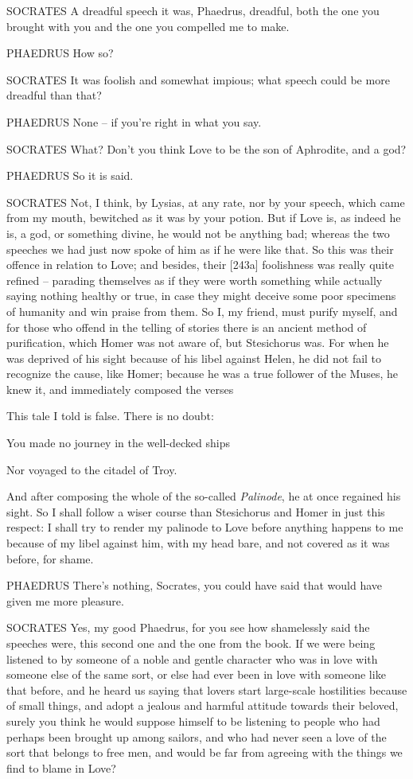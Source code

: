 SOCRATES A dreadful speech it was, Phaedrus, dreadful, both the one you
brought with you and the one you compelled me  to make.

PHAEDRUS How so?

SOCRATES It was foolish and somewhat impious; what speech could be more
dreadful than that?

PHAEDRUS None -- if you're right in what you say.

SOCRATES What? Don't you think Love to be the son of Aphrodite, and a
god?

 PHAEDRUS So it is said.

SOCRATES Not, I think, by Lysias, at any rate, nor by your 
speech, which came from my mouth, bewitched as it was by your
potion. But if Love is,
as indeed he is, a god, or something divine, he would not be anything
bad; whereas the two speeches  we had just now spoke of him as
if he were like that. So this was their offence in relation to Love; and
besides, their {[}243a{]} foolishness was really quite refined --
parading themselves as if they were worth something while actually
saying nothing healthy or true, in case they might deceive some poor
specimens of humanity and win praise from them. So I, my friend, must
purify myself, and for those who offend in the telling of stories there
is an ancient method of purification, which Homer was  not aware
of, but Stesichorus was.
For when he was deprived of his sight because of his libel against
Helen, he did not fail to recognize the cause, like Homer; because he
was a true follower of the
Muses, he knew it, and
immediately composed the verses

This tale I told is false. There is no doubt:

You made no journey in the well-decked ships

 Nor voyaged to the citadel of
Troy.

And after composing the whole of the so-called
{\em Palinode}, he at
once regained his sight. So I shall follow a wiser course than
Stesichorus and Homer in just this respect: I shall try to render
 my palinode to Love before anything happens to me because of my
libel against him, with my head bare, and not covered as it was before,
for shame.

PHAEDRUS There's nothing, Socrates, you could have said that would have
given me more pleasure.

 SOCRATES Yes, my good Phaedrus, for you see how shamelessly
said the speeches were, this second one and the one from the book. If we
were being listened to by someone of a noble and gentle character who
was in love with someone else of the same sort, or else had ever been in
love with someone like that before,  and he heard us saying that
lovers start large-scale hostilities because of small things, and adopt
a jealous and harmful attitude towards their beloved, surely you think
he would suppose himself to be listening to people who had perhaps been
brought up among sailors, and who had never seen a love of the sort that
belongs to free men, and
would be far from agreeing with  the things we find to blame in
Love?

